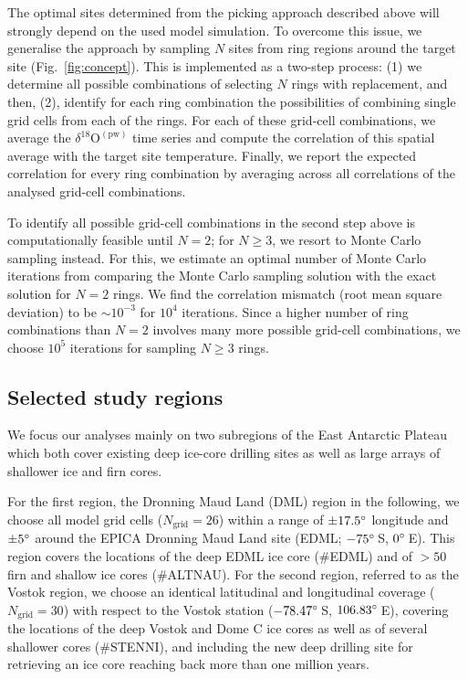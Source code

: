 \documentclass[cp, manuscript]{copernicus}
\begin{document}
The optimal sites determined from the picking approach described above will
strongly depend on the used model simulation. To overcome this issue, we
generalise the approach by sampling $N$ sites from ring regions around the
target site (Fig.~\ref{fig:concept}).  This is implemented as a two-step
process: (1) we determine all possible combinations of selecting $N$ rings with
replacement, and then, (2), identify for each ring combination the possibilities
of combining single grid cells from each of the rings. For each of these
grid-cell combinations, we average the $\delta^{18}\mathrm{O}^{\mathrm{(pw)}}$
time series and compute the correlation of this spatial average with the target
site temperature. Finally, we report the expected correlation for every ring
combination by averaging across all correlations of the analysed grid-cell
combinations.

To identify all possible grid-cell combinations in the second step above is
computationally feasible until $N=2$; for $N\geq3$, we resort to Monte Carlo
sampling instead. For this, we estimate an optimal number of Monte Carlo
iterations from comparing the Monte Carlo sampling solution with the exact
solution for $N=2$ rings. We find the correlation mismatch (root mean
square deviation) to be $\sim10^{-3}$ for $10^4$ iterations. Since a higher
number of ring combinations than $N=2$ involves many more possible grid-cell
combinations, we choose $10^5$ iterations for sampling $N\geq3$ rings.

\subsection{Selected study regions}\label{methods:regions}

We focus our analyses mainly on two subregions of the East Antarctic Plateau
which both cover existing deep ice-core drilling sites as well as large arrays
of shallower ice and firn cores.

For the first region, the Dronning Maud Land (DML) region in the following, we
choose all model grid cells ($N_{\mathrm{grid}}=26$) within a range of
$\pm17.5^{\circ}$ longitude and $\pm5^{\circ}$ around the EPICA Dronning Maud Land
site (EDML; $-75^{\circ}$\,S, $0^{\circ}$\,E). This region covers the locations of
the deep EDML ice core (\#EDML) and of $>50$ firn and shallow ice cores
(\#ALTNAU). For the second region, referred to as the Vostok region, we choose
an identical latitudinal and longitudinal coverage ($N_{\mathrm{grid}}=30$) with
respect to the Vostok station ($-78.47^{\circ}$\,S, $106.83^{\circ}$\,E), covering
the locations of the deep Vostok and Dome C ice cores as well as of several
shallower cores (\#STENNI), and including the new deep drilling site for
retrieving an ice core reaching back more than one million years.
\end{document}
